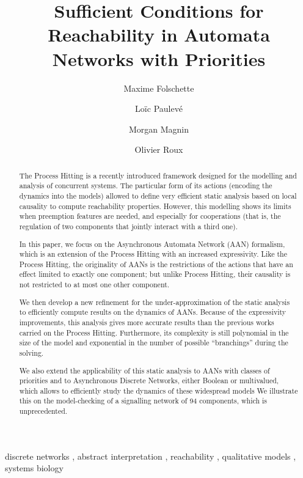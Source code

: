 \documentclass{elsarticle}
\begin{document}
\begin{frontmatter}
\title{Sufficient Conditions for Reachability in Automata Networks with Priorities}

\author[irccyn]{Maxime Folschette}
\author[lri,amib]{Loïc Paulevé}
\author[irccyn]{Morgan Magnin}
\author[irccyn]{Olivier Roux}

\address[irccyn]{LUNAM Universit\'e, \'Ecole Centrale de Nantes, IRCCyN UMR CNRS 6597\\
(Institut de Recherche en Communications et Cybern\'etique de Nantes)\\
1 rue de la No\"e - B.P. 92101 - 44321 Nantes Cedex 3, France.}

\address[lri]{CNRS, Laboratoire de Recherche en Informatique (LRI)\\
		Université Paris-Sud - CNRS UMR 8623, France}
\address[amib]{AMIB group, Inria Saclay, France}{}



\begin{abstract}
The Process Hitting is a recently introduced framework
designed for the modelling and analysis of concurrent systems.
The particular form of its actions (encoding the dynamics into the models)
allowed to define very efficient static analysis
based on local causality to compute reachability properties.
However, this modelling shows its limits when preemption features are needed,
and especially for cooperations
(that is, the regulation of two components that jointly interact with a third one).

In this paper, we focus on
the Asynchronous Automata Network (AAN) formalism,
which is an extension of the Process Hitting with an increased expressivity.
Like the Process Hitting,
the originality of AANs is the restrictions of the actions
that have an effect limited to exactly one component;
but unlike Process Hitting, their causality is not restricted to at most one other component.

We then develop a new refinement for the under-approximation of the static analysis
to efficiently compute results on the dynamics of AANs.
Because of the expressivity improvements,
this analysis gives more accurate results
than the previous works carried on the Process Hitting.
Furthermore, its complexity is still polynomial in the size of the model
and exponential in the number of possible “branchings” during the solving.

We also extend the applicability of this static analysis to
AANs with classes of priorities and to
Asynchronous Discrete Networks, either Boolean or multivalued,
which allows to efficiently study the dynamics of these widespread models
We illustrate this on the model-checking of a signalling network of 94
components, which is unprecedented.
\end{abstract}
\begin{keyword}
discrete networks \sep
abstract interpretation \sep
reachability \sep
qualitative models \sep
systems biology
\end{keyword}
\end{frontmatter}
\end{document}
